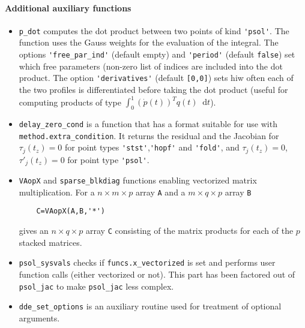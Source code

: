 \documentclass[11pt]{scrartcl}
\renewcommand{\d}{\mathop{}\!\mathrm{d}}
\newcommand{\blist}[1]{\mbox{\lstinline!#1!}}
\begin{document}
\paragraph{Additional auxiliary functions}
\begin{itemize}
\item \blist{p_dot} computes the dot product between two points of
  kind \blist{'psol'}. The function uses the Gauss weights for the
  evaluation of the integral. The options \blist{'free_par_ind'}
  (default empty) and \blist{'period'} (default \blist{false}) set
  which free parameters (non-zero list of indices are included into
  the dot product. The option \blist{'derivatives'} (default
  \blist{[0,0]}) sets hiw often each of the two profiles is
  differentiated before taking the dot product (useful for computing
  products of type $\int_0^1(\dot p(t))^Tq(t)\d t$).
\item \blist{delay_zero_cond} is a function that has a format suitable
  for use with \blist{method.extra_condition}. It returns the residual
  and the Jacobian for $\tau_j(t_z)=0$ for point types
  \blist{'stst'},\blist{'hopf'} and \blist{'fold'}, and
  $\tau_j(t_z)=0$, $\tau'_j(t_z)=0$ for point type \blist{'psol'}.
\item \blist{VAopX} and \blist{sparse_blkdiag} functions enabling
  vectorized matrix multiplication. For a $n\times m\times p$ array
  \blist{A} and a $m\times q\times p$ array \blist{B}
  \begin{lstlisting}
    C=VAopX(A,B,'*')
  \end{lstlisting}
  gives an $n\times q\times p$ array \blist{C} consisting of the
  matrix products for each of the $p$ stacked matrices.
\item \blist{psol_sysvals} checks if \blist{funcs.x_vectorized} is set
  and performs user function calls (either vectorized or not). This part
  has been factored out of \blist{psol_jac} to make \blist{psol_jac}
  less complex.
\item \blist{dde_set_options} is an auxiliary routine used for
  treatment of optional arguments.
\end{itemize}
{\small 
}
\end{document}

